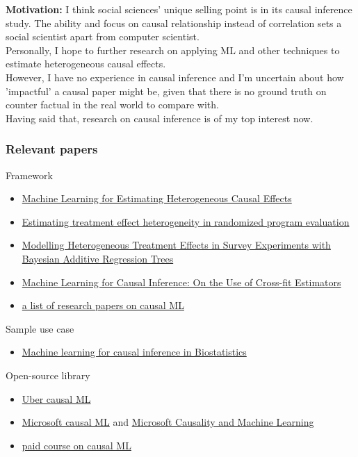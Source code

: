 \documentclass[11pt, oneside]{article}   	%
\begin{document}
    \textbf{Motivation:} I think social sciences' unique selling point is in its causal inference study. The ability and
    focus on causal relationship instead of correlation sets a social scientist apart from computer scientist. \\
    Personally, I hope to further research on applying ML and other techniques to estimate heterogeneous causal effects. \\
    However, I have no experience in causal inference and I'm uncertain about how 'impactful' a causal paper might be,
    given that there is no ground truth on counter factual in the real world to compare with. \\
    Having said that, research on causal inference is of my top interest now.

    \subsubsection{Relevant papers}
    Framework
    \begin{itemize}
        \item \href{https://ideas.repec.org/p/ecl/stabus/3350.html}{Machine Learning for Estimating Heterogeneous Causal
            Effects}
        \item \href{https://imai.fas.harvard.edu/research/files/svm.pdf}{Estimating treatment effect heterogeneity in
            randomized program evaluation}
        \item \href{https://academic.oup.com/poq/article-abstract/76/3/491/1893905}{Modelling Heterogeneous Treatment
            Effects in Survey Experiments with Bayesian Additive Regression Trees}
        \item \href{https://oce-ovid-com.libproxy1.nus.edu.sg/article/00001648-202105000-00012/HTML}{Machine Learning
            for Causal Inference: On the Use of Cross-fit Estimators}
        \item \href{https://github.com/jvpoulos/causal-ml}{a list of research papers on causal ML}
    \end{itemize}

    Sample use case
    \begin{itemize}
        \item \href{https://academic-oup-com.libproxy1.nus.edu.sg/biostatistics/article/21/2/336/5631847}{Machine
            learning for causal inference in Biostatistics}
    \end{itemize}

    Open-source library
    \begin{itemize}
        \item \href{https://github.com/uber/causalml}{Uber causal ML}
        \item \href{https://github.com/microsoft/EconML}{Microsoft causal ML} and
            \href{https://www.microsoft.com/en-us/research/group/causal-inference/}{Microsoft Causality and Machine
            Learning}
        \item \href{https://www.altdeep.ai/p/causal-ml-minicourse}{paid course on causal ML}
    \end{itemize}
\end{document}
